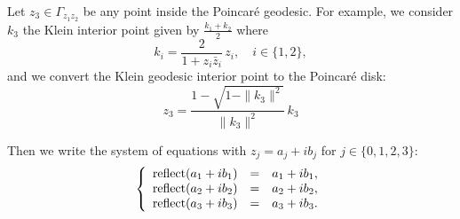 \documentclass{article}
\begin{document}
Let $z_3\in\Gamma_{z_1z_2}$ be any point inside the Poincar\'e geodesic.
For example, we consider $k_3$ the Klein interior point given by $\frac{k_1+k_2}{2}$ where
$$
k_i= \frac{2}{1+z_i\bar z_i}\, z_i,\quad i\in\{1,2\},
$$
and we convert the Klein geodesic interior point to the Poincar\'e disk:
$$
z_3=\frac{1-\sqrt{1-\|k_3\|^2}}{\|k_3\|^2} \, k_3
$$

Then we write the system of equations with $z_j=a_j+ib_j$ for $j\in\{0,1,2,3\}$:
\begin{equation}
\left\{
\begin{array}{lll}
\mathrm{reflect}(a_1+ib_1) &=& a_1+ib_1,\\
\mathrm{reflect}(a_2+ib_2) &=& a_2+ib_2,\\
\mathrm{reflect}(a_3+ib_3) &=& a_3+ib_3.
\end{array}
\right. \label{eq:syst}
\end{equation}
\end{document}
